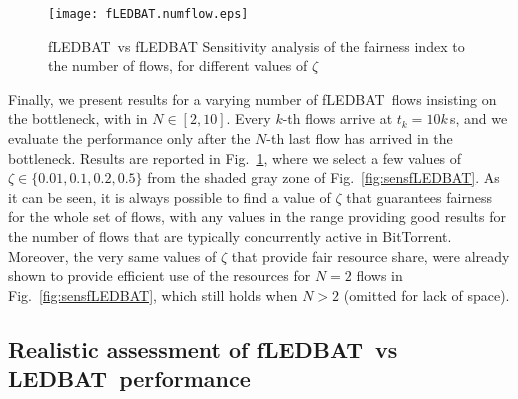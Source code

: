 \documentclass[conference]{IEEEtran}
\newcommand{\figR}[1]{Fig.~\ref{fig:#1}}
\newcommand{\figLC}[2]{
        \caption{#2}
        \label{fig:#1}
        \vspace{-5pt}
}
\newcommand{\btledbat}[0]{LEDBAT}
\newcommand{\fledbat}[0]{fLEDBAT}
\begin{document}
\begin{figure}[t]
    \begin{center}
       \texttt{[image: fLEDBAT.numflow.eps]}
        \figLC{sensN}{\fledbat\ vs \fledbat\: Sensitivity analysis of the fairness index to the number of flows, for different values of $\zeta$}
    \end{center}
\vspace{-4mm}
\end{figure}




Finally, we  present results for a varying number of \fledbat\ flows insisting on the bottleneck, with in $N\in[2,10]$. Every $k$-th flows arrive at  $t_k=10  k$\,s, and we evaluate the performance only after the $N$-th last flow has arrived in the bottleneck.
Results are reported in  \figR{sensN}, where we select a few values of $\zeta\in\{0.01,0.1, 0.2,0.5\}$ from the shaded gray zone of \figR{sensfLEDBAT}.  As it can be seen, it is always possible to find a value of  $\zeta$  that guarantees fairness for the whole set of flows, with any values in the range providing good results for the number of flows that are typically concurrently active in BitTorrent.  Moreover,  the very same values of  $\zeta$ that provide fair resource share, were already shown to provide efficient use of the resources for $N=2$ flows in  \figR{sensfLEDBAT}, which still holds when $N>2$ (omitted for lack of space).


\subsection{Realistic assessment of \fledbat\ vs \btledbat\ performance}
\end{document}

